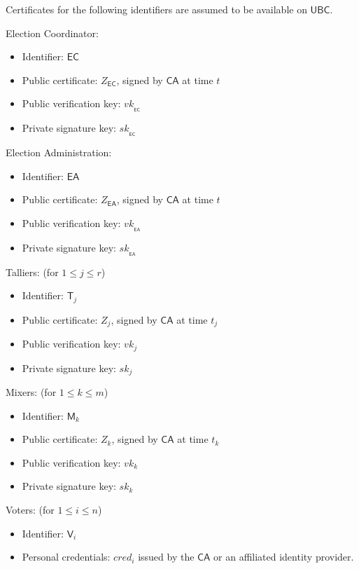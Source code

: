 \documentclass[bibtotoc,halfparskip,oneside]{scrreprt}
\newcommand{\cred}[1]{cred_{#1}\xspace}
\newcommand{\sk}[1]{\mathit{sk}_{#1}\xspace}
\newcommand{\vk}[1]{\mathit{vk}_{#1}\xspace}
\newcommand{\SK}[1]{\sk{_#1}\xspace}
\newcommand{\VK}[1]{\vk{_#1}\xspace}
\newcommand{\CA}{\ensuremath{\mathsf{CA}}\xspace}
\newcommand{\EA}{\ensuremath{\mathsf{EA}}\xspace}
\newcommand{\EC}{\ensuremath{\mathsf{EC}}\xspace}
\newcommand{\UBC}{\ensuremath{\mathsf{UBC}}\xspace}
\newcommand{\Tallier}[1]{\ensuremath{\mathsf{T}_{#1}}\xspace}
\newcommand{\Mixer}[1]{\ensuremath{\mathsf{M}_{#1}}\xspace}
\newcommand{\Voter}[1]{\ensuremath{\mathsf{V}_{#1}}\xspace}
\begin{document}
Certificates for the following identifiers are assumed to be available on \UBC.


Election Coordinator:
\begin{itemize}
	\item Identifier: \EC
	\item Public certificate: $Z_{\EC}$, signed by \CA at time $t$
	\item Public verification key: $\VK{\EC}$ 
	\item Private signature key: $\SK{\EC}$
\end{itemize}

Election Administration:
\begin{itemize}
	\item Identifier: \EA
	\item Public certificate: $Z_{\EA}$, signed by \CA at time $t$
	\item Public verification key: $\VK{\EA}$ 
	\item Private signature key: $\SK{\EA}$
\end{itemize}

Talliers: (for $1\leq j\leq r$)
\begin{itemize}
	\item Identifier: $\Tallier{j}$
	\item Public certificate: $Z_{j}$, signed by \CA at time $t_j$
	\item Public verification key: $\vk{j}$ 
	\item Private signature key: $\sk{j}$
\end{itemize}

Mixers: (for $1\leq k\leq m$)
\begin{itemize}
	\item Identifier: $\Mixer{k}$
	\item Public certificate: $Z_{k}$, signed by \CA at time $t_k$
	\item Public verification key: $\vk{k}$ 
	\item Private signature key: $\sk{k}$
\end{itemize}

Voters: (for $1\leq i\leq n$)
\begin{itemize}
	\item Identifier: $\Voter{i}$
	\item Personal credentials: $\cred{i}$ issued by the \CA or an affiliated identity provider.
\end{itemize}

\end{document}
